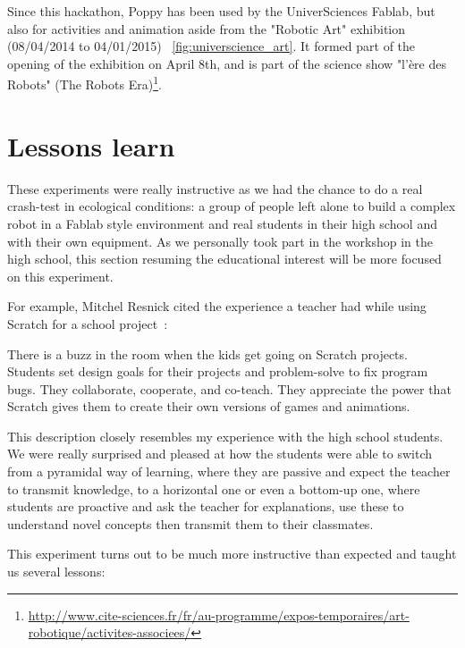 Since this hackathon, Poppy has been used by the UniverSciences Fablab, but also for activities and animation aside from the "Robotic Art" exhibition (08/04/2014 to 04/01/2015) \figurename~\ref{fig:universcience_art}. It formed part of the opening of the exhibition on April 8th, and is part of the science show "l'ère des Robots" (The Robots Era)\footnote{\url{http://www.cite-sciences.fr/fr/au-programme/expos-temporaires/art-robotique/activites-associees/}}.



\section{Lessons learn} %
\label{sec:education-lessons}

These experiments were really instructive as we had the chance to do a real crash-test in ecological conditions: a group of people left alone to build a complex robot in a Fablab style environment and real students in their high school and with their own equipment. As we personally took part in the workshop in the high school, this section resuming the educational interest will be more focused on this experiment.

For example, Mitchel Resnick cited the experience a teacher had while using Scratch for a school project~\parencite{resnick2008sowing}:
\begin{formal}
    There is a buzz in the room when the kids get going on Scratch projects. Students set design goals for their projects and problem-solve to fix program bugs. They collaborate, cooperate, and co-teach. They appreciate the power that Scratch gives them to create their own versions of games and animations.

\end{formal}

This description closely resembles my experience with the high school students. We were really surprised and pleased at how the students were able to switch from a pyramidal way of learning, where they are passive and expect the teacher to transmit knowledge, to a horizontal one or even a bottom-up one, where students are proactive and ask the teacher for explanations, use these to understand novel concepts then transmit them to their classmates.

This experiment turns out to be much more instructive than expected and taught us several lessons:

